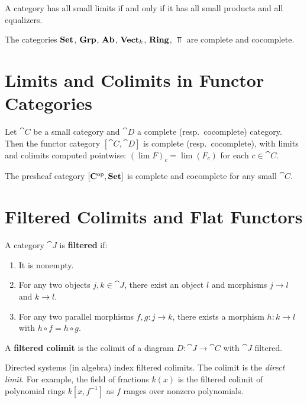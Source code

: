 \begin{corollary}
A category has all small limits if and only if it has all small products and all equalizers.
\end{corollary}

\begin{theorem}
The categories $\mathbf{Set}$, $\mathbf{Grp}$, $\mathbf{Ab}$, $\mathbf{Vect}_k$, $\mathbf{Ring}$, $\Top$ are complete and cocomplete.
\end{theorem}

\section{Limits and Colimits in Functor Categories}

\begin{theorem}
Let $\cat{C}$ be a small category and $\cat{D}$ a complete (resp.\ cocomplete) category. Then the functor category $[\cat{C}, \cat{D}]$ is complete (resp.\ cocomplete), with limits and colimits computed pointwise: $(\lim F)_c = \lim(F_c)$ for each $c \in \cat{C}$.
\end{theorem}

\begin{corollary}
The presheaf category $[\mathbf{C}^{\mathrm{op}}, \mathbf{Set}]$ is complete and cocomplete for any small $\cat{C}$.
\end{corollary}

\section{Filtered Colimits and Flat Functors}

\begin{definition}
A category $\cat{J}$ is \textbf{filtered} if:
\begin{enumerate}
  \item It is nonempty.
  \item For any two objects $j, k \in \cat{J}$, there exist an object $l$ and morphisms $j \to l$ and $k \to l$.
  \item For any two parallel morphisms $f, g: j \to k$, there exists a morphism $h: k \to l$ with $h \circ f = h \circ g$.
\end{enumerate}
A \textbf{filtered colimit} is the colimit of a diagram $D: \cat{J} \to \cat{C}$ with $\cat{J}$ filtered.
\end{definition}

\begin{example}
Directed systems (in algebra) index filtered colimits. The colimit is the \emph{direct limit}. For example, the field of fractions $k(x)$ is the filtered colimit of polynomial rings $k[x, f^{-1}]$ as $f$ ranges over nonzero polynomials.
\end{example}

